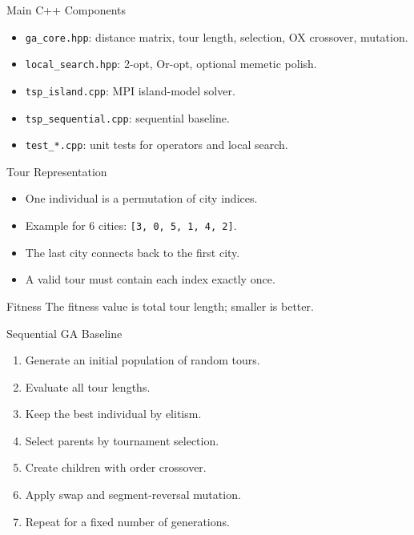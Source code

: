 \documentclass[aspectratio=169]{beamer}
\begin{document}
\begin{frame}{Main C++ Components}
  \begin{itemize}
    \item \texttt{ga\_core.hpp}: distance matrix, tour length, selection, OX crossover, mutation.
    \item \texttt{local\_search.hpp}: 2-opt, Or-opt, optional memetic polish.
    \item \texttt{tsp\_island.cpp}: MPI island-model solver.
    \item \texttt{tsp\_sequential.cpp}: sequential baseline.
    \item \texttt{test\_*.cpp}: unit tests for operators and local search.
  \end{itemize}
\end{frame}

\begin{frame}{Tour Representation}
  \begin{itemize}
    \item One individual is a permutation of city indices.
    \item Example for 6 cities: \texttt{[3, 0, 5, 1, 4, 2]}.
    \item The last city connects back to the first city.
    \item A valid tour must contain each index exactly once.
  \end{itemize}
  \begin{block}{Fitness}
    The fitness value is total tour length; smaller is better.
  \end{block}
\end{frame}

\begin{frame}{Sequential GA Baseline}
  \begin{enumerate}
    \item Generate an initial population of random tours.
    \item Evaluate all tour lengths.
    \item Keep the best individual by elitism.
    \item Select parents by tournament selection.
    \item Create children with order crossover.
    \item Apply swap and segment-reversal mutation.
    \item Repeat for a fixed number of generations.
  \end{enumerate}
\end{frame}
\end{document}
